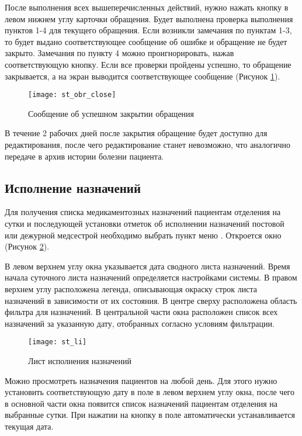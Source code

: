 После выполнения всех вышеперечисленных действий, нужно нажать кнопку   в левом нижнем углу карточки обращения. Будет выполнена проверка выполнения пунктов 1-4 для текущего обращения. Если возникли замечания по пунктам 1-3, то будет выдано соответствующее сообщение об ошибке и обращение не будет закрыто. Замечания по пункту 4 можно проигнорировать, нажав соответствующую кнопку. Если все проверки пройдены успешно, то обращение закрывается, а на экран выводится соответствующее сообщение (Рисунок \ref{img_st_obr_close}).

\begin{figure}[!ht]\centering
   \texttt{[image: st\_obr\_close]}
   \caption{Сообщение об успешном закрытии обращения}
   \label{img_st_obr_close}
\end{figure} 

В течение 2 рабочих дней после закрытия обращение будет доступно для редактирования, после чего редактирование станет невозможно, что аналогично передаче в архив истории болезни пациента.

\subsection{Исполнение назначений}

Для получения списка медикаментозных назначений пациентам отделения на сутки и последующей установки отметок об исполнении назначений постовой или дежурной медсестрой необходимо выбрать пункт меню . Откроется окно  (Рисунок \ref{img_st_li}).

В левом верхнем углу окна указывается дата сводного листа назначений. Время начала суточного листа назначений определяется настройками системы. В правом верхнем углу расположена легенда, описывающая окраску строк листа назначений в зависимости от их состояния. В центре сверху расположена область фильтра для назначений. В центральной части окна расположен список всех назначений за указанную дату, отобранных согласно условиям фильтрации. 

\begin{figure}[ht]\centering
   \texttt{[image: st\_li]}
   \caption{Лист исполнения назначений}
   \label{img_st_li}
\end{figure} 

Можно просмотреть назначения пациентов на любой день. Для этого нужно установить соответствующую дату в поле  в левом верхнем углу окна, после чего в основной части окна появится список назначений пациентам отделения на выбранные сутки. При нажатии на кнопку  в поле  автоматически устанавливается текущая дата. 

